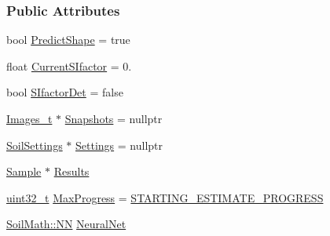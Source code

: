 \subsubsection*{Public Attributes}
\begin{DoxyCompactItemize}
\item 
bool \hyperlink{class_soil_analyzer_1_1_analyzer_a43c2a39174daac9059e48860936e38f3}{Predict\+Shape} = true
\item 
float \hyperlink{class_soil_analyzer_1_1_analyzer_a8fb13bb3f69f3f87e1cb61e453c8f5b3}{Current\+S\+Ifactor} = 0.
\item 
bool \hyperlink{class_soil_analyzer_1_1_analyzer_a144dea5736f2c1e2d86c9f655910be1f}{S\+Ifactor\+Det} = false
\item 
\hyperlink{class_soil_analyzer_1_1_analyzer_a55e2c84ab42cb967d718dd18295c1f91}{Images\+\_\+t} $\ast$ \hyperlink{class_soil_analyzer_1_1_analyzer_a483f7f65076cdbafe109ddfdfa2a0640}{Snapshots} = nullptr
\item 
\hyperlink{class_soil_analyzer_1_1_soil_settings}{Soil\+Settings} $\ast$ \hyperlink{class_soil_analyzer_1_1_analyzer_a0a17b8f11ce60cd5b22d03b9925ee16e}{Settings} = nullptr
\item 
\hyperlink{class_soil_analyzer_1_1_sample}{Sample} $\ast$ \hyperlink{class_soil_analyzer_1_1_analyzer_af80f9fa5784aa6518b3cf80de2c430fe}{Results}
\item 
\hyperlink{_soil_math_types_8h_a435d1572bf3f880d55459d9805097f62}{uint32\+\_\+t} \hyperlink{class_soil_analyzer_1_1_analyzer_aef988b5c2c2349b544dabe8882c8931a}{Max\+Progress} = \hyperlink{analyzer_8h_a7376114637d76e3bb5d1e28c37d7de94}{S\+T\+A\+R\+T\+I\+N\+G\+\_\+\+E\+S\+T\+I\+M\+A\+T\+E\+\_\+\+P\+R\+O\+G\+R\+E\+S\+S}
\item 
\hyperlink{class_soil_math_1_1_n_n}{Soil\+Math\+::\+N\+N} \hyperlink{class_soil_analyzer_1_1_analyzer_a6ea3af4b49fef5b5f289bcc2046e615e}{Neural\+Net}
\end{DoxyCompactItemize}
